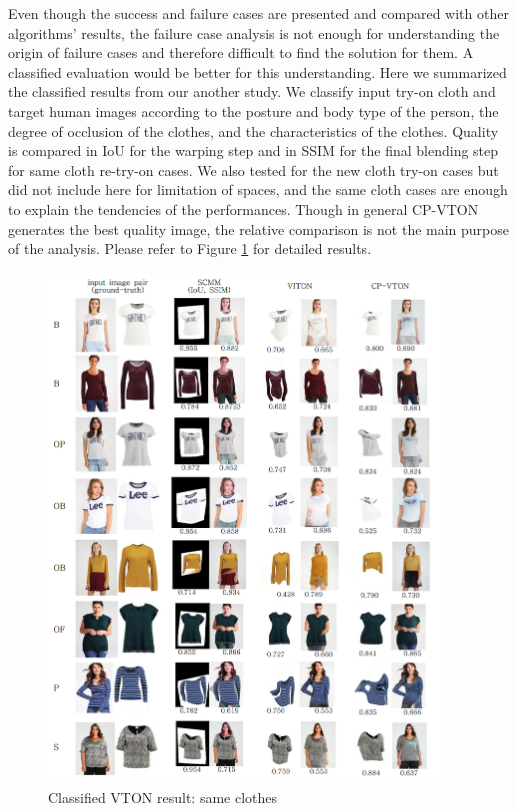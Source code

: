 Even though the success and failure cases are presented and compared with other algorithms' results, the failure case analysis is not enough for understanding the origin of failure cases and therefore difficult to find the solution for them. A classified evaluation would be better for this understanding. Here we summarized the classified results from our another study. We classify input try-on cloth and target human images according to the posture and body type of the person, the degree of occlusion of the clothes, and the characteristics of the clothes. Quality is compared in IoU for the warping step and in SSIM for the final blending step for same cloth re-try-on cases. We also tested for the new cloth try-on cases but did not include here for limitation of spaces, and the same cloth cases are enough to explain the tendencies of the performances. Though in general CP-VTON generates the best quality image, the relative comparison is not the main purpose of the analysis. Please refer to Figure \ref{fig:classified2DVTONresult} for detailed results.


\begin{figure}[t]
\centering
\includegraphics[height=13.5cm, scale=1]{figures/2dvton_same.png}   %
\caption{Classified VTON result: same clothes}
\label{fig:classified2DVTONresult}
\end{figure}



